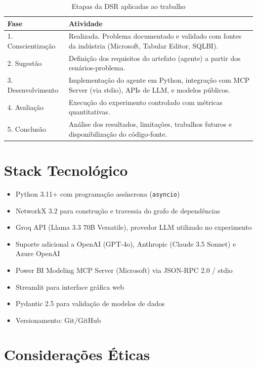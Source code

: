 \documentclass[
    12pt,               %
    openright,          %
    oneside,            %
    a4paper,            %
    chapter=TITLE,      %
    section=TITLE,      %
    brazil              %
]{abntex2}
\begin{document}
\begin{table}[H]
    \centering
    \caption{Etapas da DSR aplicadas ao trabalho}
    \label{tab:etapas-dsr}
    \begin{tabularx}{\textwidth}{lX}
        \toprule
        \textbf{Fase} & \textbf{Atividade} \\
        \midrule
        1. Conscientização & Realizada. Problema documentado e validado com fontes da indústria (Microsoft, Tabular Editor, SQLBI). \\
        2. Sugestão & Definição dos requisitos do artefato (agente) a partir dos cenários-problema. \\
        3. Desenvolvimento & Implementação do agente em Python, integração com MCP Server (via stdio), APIs de LLM, e modelos públicos. \\
        4. Avaliação & Execução do experimento controlado com métricas quantitativas. \\
        5. Conclusão & Análise dos resultados, limitações, trabalhos futuros e disponibilização do código-fonte. \\
        \bottomrule
    \end{tabularx}
\end{table}

\section{Stack Tecnológico}

\begin{itemize}
    \item Python 3.11+ com programa\c{c}\~ao ass\'incrona (\texttt{asyncio})
    \item NetworkX 3.2 para constru\c{c}\~ao e travessia do grafo de depend\^encias
    \item Groq API (Llama 3.3 70B Versatile), provedor LLM utilizado no experimento
    \item Suporte adicional a OpenAI (GPT-4o), Anthropic (Claude 3.5 Sonnet) e Azure OpenAI
    \item Power BI Modeling MCP Server (Microsoft) via JSON-RPC 2.0 / stdio
    \item Streamlit para interface gr\'afica web
    \item Pydantic 2.5 para valida\c{c}\~ao de modelos de dados
    \item Versionamento: Git/GitHub
\end{itemize}

\section{Considerações Éticas}
\label{sec:considera-eticas}
\end{document}
